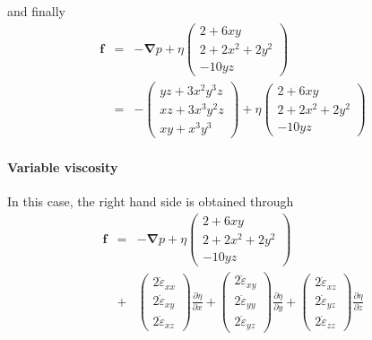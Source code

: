 and finally
\begin{eqnarray}
{\bm f} &=& 
-{\bm \nabla p} + 
\eta
\left(
\begin{array}{c}
2+6xy \\
2+2x^2+2y^2 \\
-10yz
\end{array}
\right) \nonumber\\
&=&
-
\left(
\begin{array}{c}
yz+3x^2 y^3z \\
xz+3 x^3 y^2 z \\
xy+x^3y^3
\end{array}
\right) 
+
\eta
\left(
\begin{array}{c}
2+6xy \\
2+2x^2+2y^2 \\
-10yz
\end{array}
\right)
\nonumber
\end{eqnarray}

\paragraph{Variable viscosity}

In this case, the right hand side is obtained through
\begin{eqnarray}
{\bm f} &=& -{\bm \nabla p} + 
\eta
\left(
\begin{array}{c}
2+6xy \\
2+2x^2+2y^2 \\
-10yz
\end{array}
\right) \nonumber\\
&+&
\left(
\begin{array}{c}
2 \dot{\varepsilon}_{xx} \\
2 \dot{\varepsilon}_{xy} \\
2 \dot{\varepsilon}_{xz}
\end{array}
\right) \frac{\partial \eta}{\partial x}
+
\left(
\begin{array}{c}
2 \dot{\varepsilon}_{xy} \\
2 \dot{\varepsilon}_{yy} \\
2 \dot{\varepsilon}_{yz}
\end{array}
\right) \frac{\partial \eta}{\partial y}
+
\left(
\begin{array}{c}
2 \dot{\varepsilon}_{xz} \\
2 \dot{\varepsilon}_{yz} \\
2 \dot{\varepsilon}_{zz} 
\end{array}
\right) \frac{\partial \eta}{\partial z}
\end{eqnarray}



